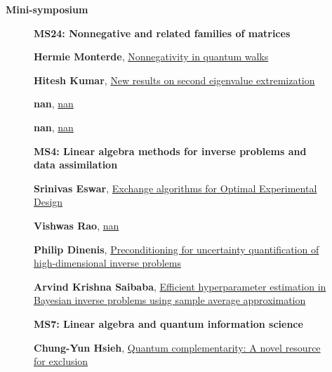 \documentclass[ILAS2025-program.tex]{subfiles}
\begin{document}
\begin{description}
    \item[] \textbf{Mini-symposium} 
    \begin{description}
    \item[] {\color{mstitle}\textbf{MS24: Nonnegative and related families of matrices}} 
    \item[] \hypertarget{up0351}{}\textbf{Hermie Monterde}, \hyperlink{down0351}{Nonnegativity in quantum walks
}
        \item[] \hypertarget{up0352}{}\textbf{Hitesh Kumar}, \hyperlink{down0352}{New results on second eigenvalue extremization}
        \item[] \hypertarget{up0353}{}\textbf{nan}, \hyperlink{down0353}{nan}
        \item[] \hypertarget{up0354}{}\textbf{nan}, \hyperlink{down0354}{nan}
        \end{description}
    \begin{description}
    \item[] {\color{mstitle}\textbf{MS4: Linear algebra methods for inverse problems and data assimilation}} 
    \item[] \hypertarget{up0355}{}\textbf{Srinivas Eswar}, \hyperlink{down0355}{Exchange algorithms for Optimal Experimental Design
}
        \item[] \hypertarget{up0356}{}\textbf{Vishwas Rao}, \hyperlink{down0356}{nan}
        \item[] \hypertarget{up0357}{}\textbf{Philip Dinenis}, \hyperlink{down0357}{Preconditioning for uncertainty quantification of high-dimensional inverse problems}
        \item[] \hypertarget{up0358}{}\textbf{Arvind Krishna Saibaba}, \hyperlink{down0358}{Efficient hyperparameter estimation in Bayesian inverse problems using sample average approximation
}
        \end{description}
    \begin{description}
    \item[] {\color{mstitle}\textbf{MS7: Linear algebra and quantum information science}} 
    \item[] \hypertarget{up0359}{}\textbf{Chung-Yun Hsieh}, \hyperlink{down0359}{Quantum complementarity: A novel resource for exclusion}

\end{description}
\end{description}
\end{document}
